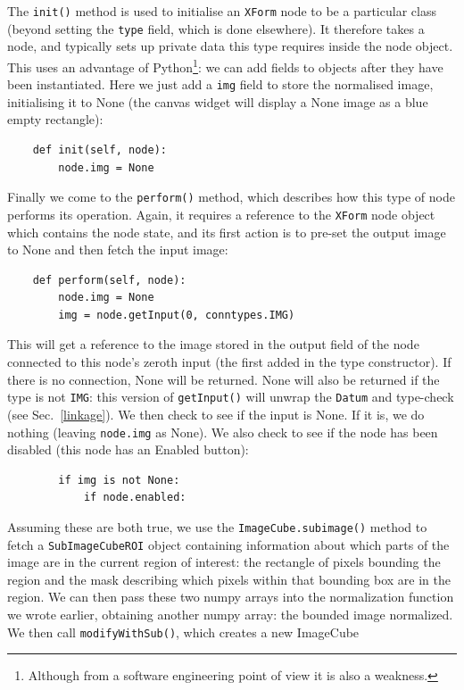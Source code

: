 The \texttt{init()} method is used to initialise an \texttt{XForm} node to be a
particular class (beyond setting the \texttt{type} field, which is done
elsewhere). It therefore takes a node, and typically sets up private data
this type requires inside the node object. This uses an advantage of
Python\footnote{Although from a software engineering point of view it is also
a weakness.}: we can add fields to objects after they have been instantiated.
Here we just add a \texttt{img} field to store the normalised image,
initialising it to None (the
canvas widget will display a None image as a blue empty rectangle):
\begin{lstlisting}
    def init(self, node):
        node.img = None
\end{lstlisting}
Finally we come to the \texttt{perform()} method, which describes how this
type of node performs its operation. Again, it requires a reference to the
\texttt{XForm} node object which contains the node state, and its first action
is to pre-set the output image to None and then fetch the input image:
\begin{lstlisting}
    def perform(self, node):
        node.img = None    
        img = node.getInput(0, conntypes.IMG)
\end{lstlisting}
This will get a reference to the image stored in the output field of the node
connected to this node's zeroth input (the first added in the type
constructor). If there is no connection, None will be returned. None will also
be returned if the type is not \texttt{IMG}: this version of \texttt{getInput()} will
unwrap the \texttt{Datum} and type-check (see Sec.~\ref{linkage}). We then check to see if the input
is None. If it is, we do nothing (leaving \texttt{node.img} as None). We also
check to see if the node has been disabled (this node has an Enabled button):
\begin{lstlisting}
        if img is not None:
            if node.enabled:
\end{lstlisting}
Assuming these are both true, we use the \texttt{ImageCube.subimage()} method to fetch
a \texttt{SubImageCubeROI} object containing information about which parts of the image are
in the current region of interest: the rectangle of pixels bounding the region and the mask
describing which pixels within that bounding box are in the region. We can then pass these two numpy
arrays into the normalization function we wrote earlier, obtaining another numpy array: the 
bounded image normalized. We then call \texttt{modifyWithSub()}, which creates a new ImageCube
